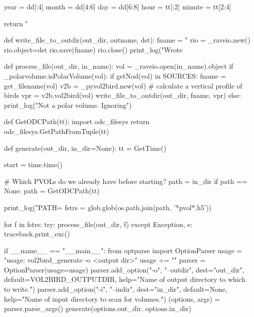 \begin{DoxyCode}
  year = dd[:4]
  month = dd[4:6]
  day = dd[6:8]
  hour = tt[:2]
  minute = tt[2:4]

  return "%

def write\_file\_to\_outdir(out\_dir, outname, dst):
  fname = "%
  rio = \_raveio.new()
  rio.object=dst
  rio.save(fname)
  rio.close()
  print\_log("Wrote %

def process\_file(out\_dir, in\_name):
  vol = \_raveio.open(in\_name).object
  if \_polarvolume.isPolarVolume(vol):
    if getNod(vol) in SOURCES:
      fname = get\_filename(vol)
      v2b = \_pyvol2bird.new(vol)
      # calculate a vertical profile of birds
      vpr = v2b.vol2bird(vol)
      write\_file\_to\_outdir(out\_dir, fname, vpr)
  else:
    print\_log("Not a polar volume. Ignoring")

def GetODCPath(tt):
  import odc\_filesys
  return odc\_filesys.GetPathFromTuple(tt)

def generate(out\_dir, in\_dir=None):
    tt = GetTime()

    start = time.time()

    # Which PVOLs do we already have before starting?
    path = in\_dir
    if path == None:
      path = GetODCPath(tt)

    print\_log("PATH=%
    fstrs = glob.glob(os.path.join(path, '*pvol*.h5'))

    for f in fstrs:
      try:
        process\_file(out\_dir, f)
      except Exception, e:
        traceback.print\_exc()

if \_\_name\_\_ == "\_\_main\_\_":
  from optparse import OptionParser
  usage = "usage: vol2bird\_generate -o <output dir>"
  usage += ""
  parser = OptionParser(usage=usage)
  parser.add\_option("-o", "--outdir", dest="out\_dir",
                    default=VOL2BIRD\_OUTPUTDIR,
                    help="Name of output directory to which to write.")
  parser.add\_option("-i", "--indir", dest="in\_dir",
                    default=None,
                    help="Name of input directory to scan for volumes.")
  (options, args) = parser.parse\_args()
  generate(options.out\_dir, options.in\_dir)
\end{DoxyCode}
 